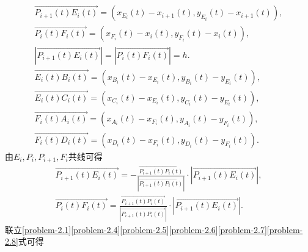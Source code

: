 \documentclass[lang=cn,newtx,10pt,scheme=chinese]{../Template/elegantbook}
\begin{document}
\begin{gather}
\overrightarrow{P_{i+1}\left( t \right) E_i\left( t \right) }=\left( x_{E_i}\left( t \right) -x_{i+1}\left( t \right) ,y_{E_i}\left( t \right) -x_{i+1}\left( t \right) \right) ,\label{problem-2.4}
\\
\overrightarrow{P_i\left( t \right) F_i\left( t \right) }=\left( x_{F_i}\left( t \right) -x_i\left( t \right) ,y_{F_i}\left( t \right) -x_i\left( t \right) \right) ,\label{problem-2.5}
\\
\left| \overrightarrow{P_{i+1}\left( t \right) E_i\left( t \right) } \right|=\left| \overrightarrow{P_i\left( t \right) F_i\left( t \right) } \right|=h.\label{problem-2.6}
\\
\overrightarrow{E_i\left( t \right) B_i\left( t \right) }=\left( x_{B_i}\left( t \right) -x_{E_i}\left( t \right) ,y_{B_i}\left( t \right) -y_{E_i}\left( t \right) \right) ,\label{problem-2..1}
\\
\overrightarrow{E_i\left( t \right) C_i\left( t \right) }=\left( x_{C_i}\left( t \right) -x_{E_i}\left( t \right) ,y_{C_i}\left( t \right) -y_{E_i}\left( t \right) \right) ,\label{problem-2..2}
\\
\overrightarrow{F_i\left( t \right) A_i\left( t \right) }=\left( x_{A_i}\left( t \right) -x_{F_i}\left( t \right) ,y_{A_i}\left( t \right) -y_{F_i}\left( t \right) \right) ,\label{problem-2..3}
\\
\overrightarrow{F_i\left( t \right) D_i\left( t \right) }=\left( x_{D_i}\left( t \right) -x_{F_i}\left( t \right) ,y_{D_i}\left( t \right) -y_{F_i}\left( t \right) \right) .\label{problem-2..4}
\end{gather}
由$E_i,P_i,P_{i+1},F_i$共线可得
\begin{gather}
\overrightarrow{P_{i+1}\left( t \right) E_i\left( t \right) }=-\frac{\overrightarrow{P_{i+1}\left( t \right) P_i\left( t \right) }}{\left| \overrightarrow{P_{i+1}\left( t \right) P_i\left( t \right) } \right|}\cdot \left| \overrightarrow{P_{i+1}\left( t \right) E_i\left( t \right) } \right|,\label{problem-2.7}
\\
\overrightarrow{P_i\left( t \right) F_i\left( t \right) }=\frac{\overrightarrow{P_{i+1}\left( t \right) P_i\left( t \right) }}{\left| \overrightarrow{P_{i+1}\left( t \right) P_i\left( t \right) } \right|}\cdot \left| \overrightarrow{P_{i+1}\left( t \right) E_i\left( t \right) } \right|.\label{problem-2.8}
\end{gather}
联立\eqref{problem-2.1}\eqref{problem-2.4}\eqref{problem-2.5}\eqref{problem-2.6}\eqref{problem-2.7}\eqref{problem-2.8}式可得
\end{document}
